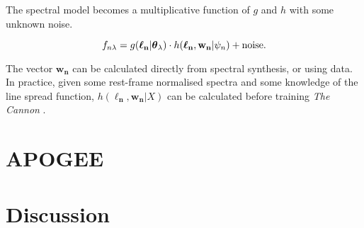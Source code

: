 \documentclass[useAMS,usenatbib]{mn2e}
\newcommand\tc{\textit{The Cannon} }
\newcommand\lv{\mathbf{\boldsymbol\ell_n}}
\newcommand\cv{{\boldsymbol\theta}_\lambda}
\newcommand\wv{\mathbf{w_n}}
\newcommand\given{|}
\begin{document}
The spectral model becomes a multiplicative function of $g$ and $h$ with some
unknown noise.

\begin{equation}
    f_{n\lambda} = g(\lv\given\cv) \cdot h(\lv,\wv\given\psi_n) +  {\rm noise}.
\end{equation}

The vector $\wv$ can be calculated directly from spectral synthesis, or using data.
In practice, given some rest-frame normalised spectra and some knowledge of the
line spread function, $h(\lv,\wv\given{}X)$ can be calculated before training \tc.







\section{APOGEE}





\section{Discussion}




\end{document}

